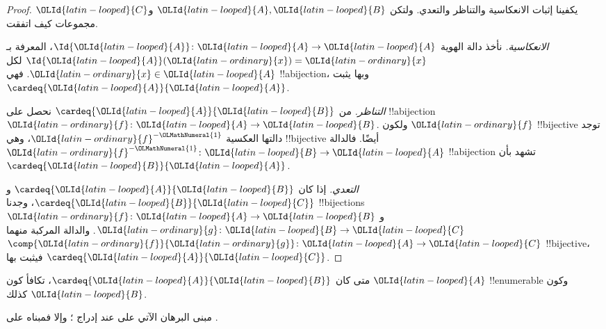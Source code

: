 \documentclass[../../../include/open-logic-section]{subfiles}
\begin{document}
\begin{proof}
يكفينا إثبات الانعكاسية والتناظر والتعدي. ولتكن ${\OLId{latin-looped}{A}}, {\OLId{latin-looped}{B}}$ و${\OLId{latin-looped}{C}}$ مجموعات كيف اتفقت.

\emph{الانعكاسية.} نأخذ دالة الهوية $\Id{{\OLId{latin-looped}{A}}} \colon {\OLId{latin-looped}{A}} \to {\OLId{latin-looped}{A}}$، المعرفة بـ$\Id{{\OLId{latin-looped}{A}}} ({\OLId{latin-ordinary}{x}}) = {\OLId{latin-ordinary}{x}}$ لكل ${\OLId{latin-ordinary}{x}} \in {\OLId{latin-looped}{A}}$. فهي !!a{bijection}، وبها يثبت $\cardeq{{\OLId{latin-looped}{A}}}{{\OLId{latin-looped}{A}}}$.

\emph{التناظر.} من $\cardeq{{\OLId{latin-looped}{A}}}{{\OLId{latin-looped}{B}}}$ نحصل على !!a{bijection} ${\OLId{latin-ordinary}{f}}\colon {\OLId{latin-looped}{A}} \to {\OLId{latin-looped}{B}}$. ولكون ${\OLId{latin-ordinary}{f}}$ !!{bijective} توجد دالتها العكسية ${\OLId{latin-ordinary}{f}}^{-{\OLMathNumeral{1}}}$، وهي !!{bijective} أيضًا. فالدالة ${\OLId{latin-ordinary}{f}}^{-{\OLMathNumeral{1}}}\colon {\OLId{latin-looped}{B}} \to {\OLId{latin-looped}{A}}$ !!a{bijection} تشهد بأن $\cardeq{{\OLId{latin-looped}{B}}}{{\OLId{latin-looped}{A}}}$.

\emph{التعدي.} إذا كان $\cardeq{{\OLId{latin-looped}{A}}}{{\OLId{latin-looped}{B}}}$ و$\cardeq{{\OLId{latin-looped}{B}}}{{\OLId{latin-looped}{C}}}$، وجدنا !!{bijection}s ${\OLId{latin-ordinary}{f}}\colon {\OLId{latin-looped}{A}} \to {\OLId{latin-looped}{B}}$ و${\OLId{latin-ordinary}{g}}\colon {\OLId{latin-looped}{B}} \to
{\OLId{latin-looped}{C}}$. والدالة المركبة منهما $\comp{{\OLId{latin-ordinary}{f}}}{{\OLId{latin-ordinary}{g}}}\colon {\OLId{latin-looped}{A}} \to {\OLId{latin-looped}{C}}$ !!{bijective}، فيثبت بها $\cardeq{{\OLId{latin-looped}{A}}}{{\OLId{latin-looped}{C}}}$.
\end{proof}

\begin{prop}
متى كان $\cardeq{{\OLId{latin-looped}{A}}}{{\OLId{latin-looped}{B}}}$، تكافأ كون ${\OLId{latin-looped}{A}}$ !!{enumerable} وكون ${\OLId{latin-looped}{B}}$ كذلك.
\end{prop}

\begin{editorial}
مبنى البرهان الآتي على  عند إدراج ؛ وإلا فمبناه على .
\end{editorial}
\end{document}

